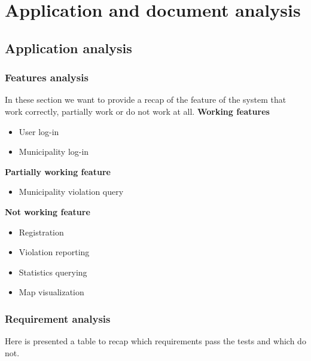 \documentclass[../ATD.tex]{subfiles}
\begin{document}
    \chapter{Application and document analysis}\label{ch:application-and-document-analysis}
    \section{Application analysis}\label{sec:application-analysis}
    \subsection{Features analysis}\label{subsec:feature-analysis}
    In these section we want to provide a recap of the feature of the system that work correctly, partially work or do not work at all.
    \newline
    \textbf{Working features}
    \begin{itemize}
        \item User log-in
        \item Municipality log-in
    \end{itemize}
    \textbf{Partially working feature}
    \begin{itemize}
        \item Municipality violation query
    \end{itemize}

    \textbf{Not working feature}
    \begin{itemize}
        \item Registration
        \item Violation reporting
        \item Statistics querying
        \item Map visualization
    \end{itemize}
    \subsection{Requirement analysis}\label{subsec:requirement-analysis}
    Here is presented a table to recap which requirements pass the tests and which do not.
\end{document}
